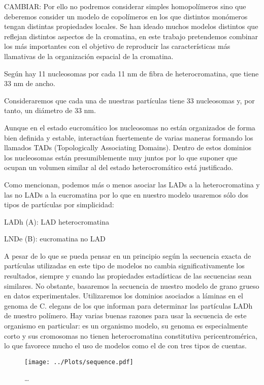 CAMBIAR: Por ello no podremos considerar simples homopolímeros sino que deberemos consider un modelo de copolímeros en los que distintos monómeros tengan distintas propiedades locales. Se han ideado muchos modelos distintos que reflejan distintos aspectos de la cromatina, en este trabajo pretendemos combinar los más importantes con el objetivo de reproducir las características más llamativas de la organización espacial de la cromatina.

Según \cite{Robinson2006} hay 11 nucleosomas por cada 11 nm de fibra de heterocromatina, que tiene 33 nm de ancho.

Consideraremos que cada una de nuestras partículas tiene 33 nucleosomas y, por tanto, un diámetro de 33 nm.

Aunque en el estado eucromático los nucleosomas no están organizados de forma bien definida y estable, interactúan fuertemente de varias maneras formando los llamados TADs (Topologically Associating Domains). Dentro de estos dominios los nucleosomas están presumiblemente muy juntos por lo que suponer que ocupan un volumen similar al del estado heterocromático está justificado.

Como \cite{Bajpai2021} mencionan, podemos más o menos asociar las LADs a la heterocromatina y las no LADs a la eucromatina por lo que en nuestro modelo usaremos sólo dos tipos de partículas por simplicidad:

LADh (A): LAD heterocromatina

LNDe (B): eucromatina no LAD

A pesar de lo que se pueda pensar en un principio según \cite{Bajpai2021} la secuencia exacta de partículas utilizadas en este tipo de modelos no cambia significativamente los resultados, siempre y cuando las propiedades estadísticas de las secuencias sean similares. No obstante, basaremos la secuencia de nuestro modelo de grano grueso en datos experimentales. Utilizaremos los dominios asociados a láminas en el genoma de C. elegans de los que informan \cite{Ho2014} para determinar las partículas LADh de nuestro polímero. Hay varias buenas razones para usar la secuencia de este organismo en particular: es un organismo modelo, su genoma es especialmente corto y sus cromosomas no tienen heterocromatina constitutiva pericentromérica, lo que favorece mucho el uso de modelos como el de \cite{Falk2019} con tres tipos de cuentas.

\begin{figure}
    \centering
    \texttt{[image: ../Plots/sequence.pdf]}
    \caption{\dots}
    \label{fig:sequence}
\end{figure}

